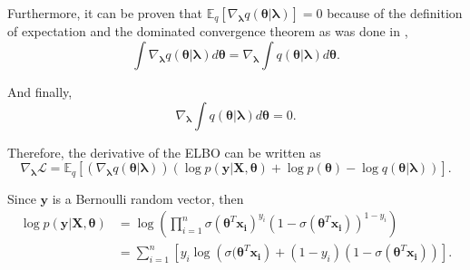 
Furthermore, it can be proven that $\mathbb{E}_q \left[ \nabla_{\boldsymbol{\lambda}} q(\boldsymbol{\theta} | \boldsymbol{\lambda}) \right] = 0$ because of the definition of expectation and the dominated convergence theorem as was done in \cite{ranganath2014black},
\begin{equation}
  \int \nabla_{\boldsymbol{\lambda}} q(\boldsymbol{\theta} | \boldsymbol{\lambda}) d\boldsymbol{\theta} =
    \nabla_{\boldsymbol{\lambda}} \int q(\boldsymbol{\theta} | \boldsymbol{\lambda}) d\boldsymbol{\theta}.
\end{equation}

And finally,
\begin{equation}
    \nabla_{\boldsymbol{\lambda}} \int q(\boldsymbol{\theta} | \boldsymbol{\lambda}) d\boldsymbol{\theta} = 0.
\end{equation}

Therefore, the derivative of the ELBO can be written as
\begin{equation}
  \nabla_{\boldsymbol{\lambda}} \mathcal{L} = \mathbb{E}_q \left[ \left( \nabla_{\boldsymbol{\lambda}} q(\boldsymbol{\theta} | \boldsymbol{\lambda}) \right) \left( \log p(\boldsymbol{y} | \boldsymbol{X}, \boldsymbol{\theta}) + \log p(\boldsymbol{\theta}) - \log q(\boldsymbol{\theta} | \boldsymbol{\lambda}) \right) \right].
\end{equation}

Since $\boldsymbol{y}$ is a Bernoulli random vector, then
\begin{equation}
  \begin{split}
      \log p(\boldsymbol{y} | \boldsymbol{X}, \boldsymbol{\theta}) &=
      \log \left( \prod_{i = 1}^n \sigma(\boldsymbol{\theta}^T \boldsymbol{x_i})^{y_i} (1 - \sigma(\boldsymbol{\theta}^T \boldsymbol{x_i}))^{1-y_i} \right) \\
      &= \sum_{i = 1}^n \left[ y_i \log \left( \sigma(\boldsymbol{\theta}^T \boldsymbol{x_i} \right) + (1 - y_i) (1 - \sigma(\boldsymbol{\theta}^T \boldsymbol{x_i})) \right].
  \end{split}
\end{equation}

